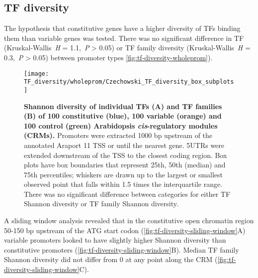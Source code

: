 \documentclass[../main.tex]{subfiles}
\begin{document}
\subsection{TF diversity}
The hypothesis that constitutive genes have a higher diversity of TFs binding them than variable genes was tested.
There was no significant difference in TF (Kruskal\hyp{}Wallis~\textit{H} = 1.1,~\textit{P} \textgreater{} 0.05) or TF family diversity (Kruskal\hyp{}Wallis~\textit{H} = 0.3,~\textit{P} \textgreater{} 0.05) between promoter types \autoref{fig:tf-diversity-wholeprom}).

\begin{figure}[hbt!]
	\begin{center}
		\capstart
		\texttt{[image: TF\_diversity/wholeprom/Czechowski\_TF\_diversity\_box\_subplots]}
		\caption{
			\textbf{Shannon diversity of individual TFs (A) and TF families (B) of 100 constitutive (blue), 100 variable (orange) and 100 control (green) Arabidopsis \textit{cis}\hyp{}regulatory modules (CRMs).}
			Promoters were extracted 1000 bp upstream of the annotated Araport 11 \autocite{chengAraport11CompleteReannotation2017} TSS or until the nearest gene.
			5UTRs were extended downstream of the TSS to the closest coding region.  Box plots have box boundaries that represent 25th, 50th (median) and 75th percentiles; whiskers are drawn up to the largest or smallest observed point that falls within 1.5 times the interquartile range.
			There was no significant difference between categories for either TF Shannon diversity or TF family Shannon diversity.
			\label{fig:tf-diversity-wholeprom}
		}
	\end{center}
\end{figure}

A sliding window analysis revealed that in the constitutive open chromatin region 50-150 bp upstream of the ATG start codon (\autoref{fig:tf-diversity-sliding-window}A) variable promoters looked to have slightly higher Shannon diversity than constitutive promoters (\autoref{fig:tf-diversity-sliding-window}B). Median TF family Shannon diversity did not differ from 0 at any point along the CRM (\autoref{fig:tf-diversity-sliding-window}C).
\end{document}

